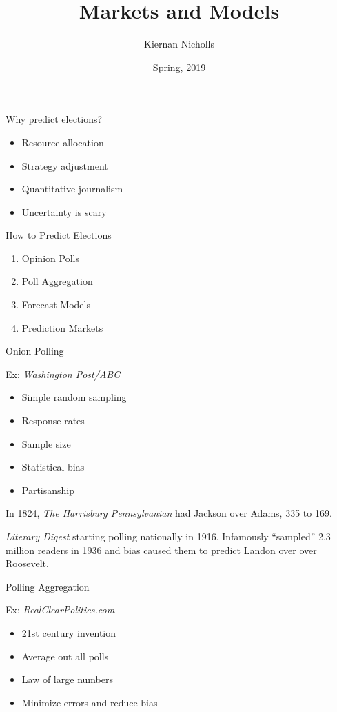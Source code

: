 \documentclass[ignorenonframetext,]{beamer}
\title{Markets and Models}
\author{Kiernan Nicholls}
\date{Spring, 2019}
\providecommand{\tightlist}{%
  \setlength{\itemsep}{0pt}\setlength{\parskip}{0pt}}
\begin{document}
\frame{\titlepage}

\begin{frame}{Why predict elections?}
\protect\hypertarget{why-predict-elections}{}

\begin{itemize}
\tightlist
\item
  Resource allocation
\item
  Strategy adjustment
\item
  Quantitative journalism
\item
  Uncertainty is scary
\end{itemize}

\end{frame}

\begin{frame}{How to Predict Elections}
\protect\hypertarget{how-to-predict-elections}{}

\begin{enumerate}
\tightlist
\item
  Opinion Polls
\item
  Poll Aggregation
\item
  Forecast Models
\item
  Prediction Markets
\end{enumerate}

\end{frame}

\begin{frame}{Onion Polling}
\protect\hypertarget{onion-polling}{}

Ex: \emph{Washington Post/ABC}

\begin{itemize}
\tightlist
\item
  Simple random sampling
\item
  Response rates
\item
  Sample size
\item
  Statistical bias
\item
  Partisanship
\end{itemize}

In 1824, \emph{The Harrisburg Pennsylvanian} had Jackson over Adams, 335
to 169.

\emph{Literary Digest} starting polling nationally in 1916. Infamously
``sampled'' 2.3 million readers in 1936 and bias caused them to predict
Landon over over Roosevelt.

\end{frame}

\begin{frame}{Polling Aggregation}
\protect\hypertarget{polling-aggregation}{}

Ex: \emph{RealClearPolitics.com}

\begin{itemize}
\tightlist
\item
  21st century invention
\item
  Average out all polls
\item
  Law of large numbers
\item
  Minimize errors and reduce bias
\end{itemize}

\end{frame}
\end{document}
